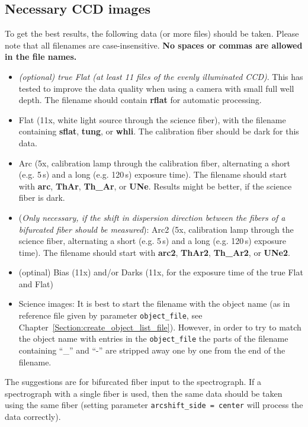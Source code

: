 \documentclass[10pt,a4paper]{article}
\begin{document}
\subsection{Necessary CCD images}

To get the best results, the following data (or more files) should be taken. Please note that all filenames are case-insensitive. \textbf{No spaces or commas are allowed in the file names.}
\begin{itemize}
  \item \textit{(optional) true Flat (at least 11 files of the evenly illuminated CCD)}. This has tested to improve the data quality when using a camera with small full well depth. The filename should contain \textbf{rflat} for automatic processing.
  \item Flat (11x, white light source through the science fiber), with the filename containing \textbf{sflat}, \textbf{tung}, or \textbf{whli}. The calibration fiber should be dark for this data.
  \item Arc (5x, calibration lamp through the calibration fiber, alternating a short (e.g. 5\,s) and a long (e.g. 120\,s) exposure time). The filename should start with \textbf{arc}, \textbf{ThAr}, \textbf{Th\_Ar}, or \textbf{UNe}. Results might be better, if the science fiber is dark.
  \item (\textit{Only necessary, if the shift in dispersion direction between the fibers of a bifurcated fiber should be measured}): Arc2 (5x, calibration lamp through the science fiber, alternating a short (e.g. 5\,s) and a long (e.g. 120\,s) exposure time). The filename should start with \textbf{arc2}, \textbf{ThAr2}, \textbf{Th\_Ar2}, or \textbf{UNe2}.
  \item (optinal) Bias (11x) and/or Darks (11x, for the exposure time of the true Flat and Flat)%
  \item Science images: It is best to start the filename with the object name (as in reference file given by parameter \verb|object_file|, see Chapter~\ref{Section:create_object_list_file}). However, in order to try to match the object name with entries in the \verb|object_file| the parts of the filename containing ``\_'' and ``-'' are stripped away one by one from the end of the filename.
\end{itemize}
The suggestions are for bifurcated fiber input to the spectrograph. If a spectrograph with a single fiber is used, then the same data should be taken using the same fiber (setting parameter \verb|arcshift_side = center| will process the data correctly).
\end{document}
